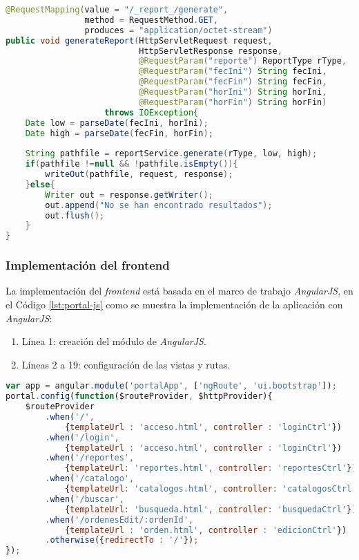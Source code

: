 \begin{enumerate}
\pagebreak

\begin{lstlisting}[language=Java, caption={Servicio web para generar un reporte.}, captionpos=b, label={lst:report-controller-gen}]
@RequestMapping(value = "/_report_/generate",
				method = RequestMethod.GET,
				produces = "application/octet-stream")
public void generateReport(HttpServletRequest request,
						   HttpServletResponse response,
						   @RequestParam("reporte") ReportType rType,
						   @RequestParam("fecIni") String fecIni,
						   @RequestParam("fecFin") String fecFin,
						   @RequestParam("horIni") String horIni,
						   @RequestParam("horFin") String horFin)
					throws IOException{
	Date low = parseDate(fecIni, horIni);
	Date high = parseDate(fecFin, horFin);
	
	String pathfile = reportService.generate(rType, low, high);
	if(pathfile !=null && !pathfile.isEmpty()){
		writeOut(pathfile, request, response);
	}else{
		Writer out = response.getWriter();
		out.append("No se han encontrado resultados");
		out.flush();
	}
}
\end{lstlisting}

\end{enumerate}


\subsubsection{Implementación del frontend}\label{sec:frontend}
La implementación del \textit{frontend} está basada en el marco de trabajo \textit{AngularJS}, en el Código \ref{lst:portal-js} como se muestra la implementación de la aplicación con \textit{AngularJS}:
\begin{enumerate}
	\item Línea 1: creación del módulo de \textit{AngularJS}.
	\item Líneas 2 a 19: configuración de las vistas y rutas.
\end{enumerate}
\begin{lstlisting}[language=Javascript, caption={Módulo de \textit{AngularJS} para el \textbf{Portal Web}}, captionpos=b, label={lst:portal-js}]
var app = angular.module('portalApp', ['ngRoute', 'ui.bootstrap']);
portal.config(function($routeProvider, $httpProvider){
	$routeProvider
		.when('/',
			{templateUrl : 'acceso.html', controller : 'loginCtrl'})
		.when('/login',
			{templateUrl : 'acceso.html', controller : 'loginCtrl'})
		.when('/reportes',
			{templateUrl: 'reportes.html', controller: 'reportesCtrl'})
		.when('/catalogo',
			{templateUrl: 'catalogos.html', controller: 'catalogosCtrl'})
		.when('/buscar',
			{templateUrl: 'busqueda.html', controller: 'busquedaCtrl'})
		.when('/ordenesEdit/:ordenId',
			{templateUrl : 'orden.html', controller : 'edicionCtrl'})
		.otherwise({redirectTo : '/'});
});
\end{lstlisting}

